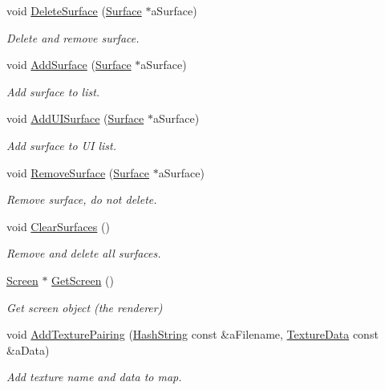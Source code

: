 \begin{DoxyCompactItemize}
void \hyperlink{classGraphicsManager_a12e8318dd3ef781a994a78d33214660a}{Delete\+Surface} (\hyperlink{classSurface}{Surface} $\ast$a\+Surface)
\begin{DoxyCompactList}\small\item\em Delete and remove surface. \end{DoxyCompactList}\item 
void \hyperlink{classGraphicsManager_a9867778257c9814c53f5377726a67e3d}{Add\+Surface} (\hyperlink{classSurface}{Surface} $\ast$a\+Surface)
\begin{DoxyCompactList}\small\item\em Add surface to list. \end{DoxyCompactList}\item 
void \hyperlink{classGraphicsManager_a664d36ea0771266310e651b36bd00ac7}{Add\+U\+I\+Surface} (\hyperlink{classSurface}{Surface} $\ast$a\+Surface)
\begin{DoxyCompactList}\small\item\em Add surface to UI list. \end{DoxyCompactList}\item 
void \hyperlink{classGraphicsManager_a52a9e1cbf5cf1f9f77362746bd23c4ab}{Remove\+Surface} (\hyperlink{classSurface}{Surface} $\ast$a\+Surface)
\begin{DoxyCompactList}\small\item\em Remove surface, do not delete. \end{DoxyCompactList}\item 
void \hyperlink{classGraphicsManager_aa06713d624d1855396132f310700e94f}{Clear\+Surfaces} ()
\begin{DoxyCompactList}\small\item\em Remove and delete all surfaces. \end{DoxyCompactList}\item 
\hyperlink{classScreen}{Screen} $\ast$ \hyperlink{classGraphicsManager_afb9c819b4df0191b82bfdd166304ec8c}{Get\+Screen} ()
\begin{DoxyCompactList}\small\item\em Get screen object (the renderer) \end{DoxyCompactList}\item 
void \hyperlink{classGraphicsManager_a48a4cae271ec07dce8f827e5de935ecd}{Add\+Texture\+Pairing} (\hyperlink{classHashString}{Hash\+String} const \&a\+Filename, \hyperlink{structTextureData}{Texture\+Data} const \&a\+Data)
\begin{DoxyCompactList}\small\item\em Add texture name and data to map. \end{DoxyCompactList}\item 

\end{DoxyCompactItemize}
